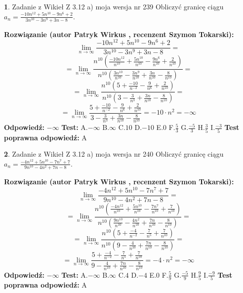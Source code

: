 \documentclass[12pt, a4paper]{article}
\theoremstyle{definition} %
\newtheorem{zad}{}
\newcommand{\zadStart}[1]{\begin{zad}#1\newline}
\newcommand{\zadStop}{\end{zad}}
\newcommand{\rozwStart}[2]{\noindent \textbf{Rozwiązanie (autor #1 , recenzent #2): }\newline}
\newcommand{\rozwStop}{\newline}
\newcommand{\odpStart}{\noindent \textbf{Odpowiedź:}\newline}
\newcommand{\odpStop}{\newline}
\newcommand{\testStart}{\noindent \textbf{Test:}\newline}
\newcommand{\testStop}{\newline}
\newcommand{\kluczStart}{\noindent \textbf{Test poprawna odpowiedź:}\newline}
\newcommand{\kluczStop}{\newline}
\begin{document}
\zadStart{Zadanie z Wikieł Z 3.12 a) moja wersja nr 239}
Obliczyć granicę ciągu $a_{n}=\frac{-10n^{12}+5n^{10}-9n^{6}+2}{3n^{10}-3n^{9}+3n-8}$.
\zadStop
\rozwStart{Patryk Wirkus}{Szymon Tokarski}
$$\lim\limits_{n\to\infty}\frac{-10n^{12}+5n^{10}-9n^{6}+2}{3n^{10}-3n^{9}+3n-8}=$$
$$=\lim\limits_{n\to\infty}\frac{n^{10}\left(\frac{-10n^{12}}{n^{10}}+\frac{5n^{10}}{n^{10}}-\frac{9n^{6}}{n^{10}}+\frac{2}{n^{10}}\right)}{n^{10}\left(\frac{3n^{10}}{n^{10}}-\frac{3n^{9}}{n^{10}}+\frac{3n}{n^{10}}-\frac{8}{n^{10}}\right)}=$$
$$=\lim\limits_{n\to\infty}\frac{n^{10}\left(5+\frac{-10}{n^{-2}}-\frac{9}{n^{6}}+\frac{2}{n^{10}}\right)}
{n^{10}\left(3-\frac{3}{n^{3}}+\frac{3n}{n^{10}}-\frac{8}{n^{10}}\right)}=$$
$$=\lim\limits_{n\to\infty}\frac{5+\frac{-10}{n^{-2}}-\frac{9}{n^{6}}+\frac{2}{n^{10}}}{3-\frac{3}{n^{3}}+\frac{3n}{n^{10}}-\frac{8}{n^{10}}}=-10\cdot n^{2} = -\infty$$
\rozwStop
\odpStart
$-\infty$
\odpStop
\testStart
A.$-\infty$
B.$\infty$
C.$10$
D.$-10$
E.$0$
F.$\frac{5}{3}$
G.$\frac{-5}{3}$
H.$\frac{3}{5}$
I.$\frac{-3}{5}$
\testStop
\kluczStart
A
\kluczStop



\zadStart{Zadanie z Wikieł Z 3.12 a) moja wersja nr 240}
Obliczyć granicę ciągu $a_{n}=\frac{-4n^{12}+5n^{10}-7n^{7}+7}{9n^{10}-4n^{2}+7n-8}$.
\zadStop
\rozwStart{Patryk Wirkus}{Szymon Tokarski}
$$\lim\limits_{n\to\infty}\frac{-4n^{12}+5n^{10}-7n^{7}+7}{9n^{10}-4n^{2}+7n-8}=$$
$$=\lim\limits_{n\to\infty}\frac{n^{10}\left(\frac{-4n^{12}}{n^{10}}+\frac{5n^{10}}{n^{10}}-\frac{7n^{7}}{n^{10}}+\frac{7}{n^{10}}\right)}{n^{10}\left(\frac{9n^{10}}{n^{10}}-\frac{4n^{2}}{n^{10}}+\frac{7n}{n^{10}}-\frac{8}{n^{10}}\right)}=$$
$$=\lim\limits_{n\to\infty}\frac{n^{10}\left(5+\frac{-4}{n^{-2}}-\frac{7}{n^{5}}+\frac{7}{n^{10}}\right)}
{n^{10}\left(9-\frac{4}{n^{10}}+\frac{7n}{n^{10}}-\frac{8}{n^{10}}\right)}=$$
$$=\lim\limits_{n\to\infty}\frac{5+\frac{-4}{n^{-2}}-\frac{7}{n^{5}}+\frac{7}{n^{10}}}{9-\frac{4}{n^{10}}+\frac{7n}{n^{10}}-\frac{8}{n^{10}}}=-4\cdot n^{2} = -\infty$$
\rozwStop
\odpStart
$-\infty$
\odpStop
\testStart
A.$-\infty$
B.$\infty$
C.$4$
D.$-4$
E.$0$
F.$\frac{5}{9}$
G.$\frac{-5}{9}$
H.$\frac{9}{5}$
I.$\frac{-9}{5}$
\testStop
\kluczStart
A
\kluczStop
\end{document}
